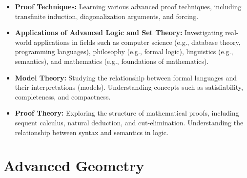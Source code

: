\documentclass[openany]{book}
\begin{document}
\begin{itemize}
    \item \textbf{Proof Techniques:} Learning various advanced proof techniques, including transfinite induction, diagonalization arguments, and forcing.
    \item \textbf{Applications of Advanced Logic and Set Theory:} Investigating real-world applications in fields such as computer science (e.g., database theory, programming languages), philosophy (e.g., formal logic), linguistics (e.g., semantics), and mathematics (e.g., foundations of mathematics).
    \item \textbf{Model Theory:} Studying the relationship between formal languages and their interpretations (models). Understanding concepts such as satisfiability, completeness, and compactness.
    \item \textbf{Proof Theory:} Exploring the structure of mathematical proofs, including sequent calculus, natural deduction, and cut-elimination. Understanding the relationship between syntax and semantics in logic.
\end{itemize}
\section{Advanced Geometry}
\end{document}
